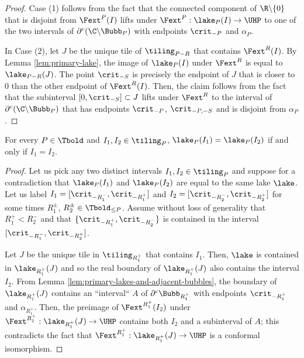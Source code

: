 \documentclass{amsart}
\begin{document}
\begin{proof}
    Case (1) follows from the fact that the connected component of $\R \backslash \{0\}$ that is disjoint from $\Fext^P(I)$ lifts under $\Fext^P : \lake_P(I) \to \UHP$ to one of the two intervals of $\partial^c(\C \backslash \Bubb_P)$ with endpoints $\crit_{-P}$ and $\alpha_P$.

    In Case (2), let $J$ be the unique tile of $\tiling_{P-R}$ that contains $\Fext^R(I)$.
    By Lemma \ref{lem:primary-lake}, the image of $\lake_P(I)$ under $\Fext^R$ is equal to $\lake_{P-R}(J)$.
    The point $\crit_{-S}$ is precisely the endpoint of $J$ that is closer to $0$ than the other endpoint of $\Fext^R(I)$.
    Then, the claim follows from the fact that the subinterval $[0,\crit_{-S}] \subset J$ lifts under $\Fext^R$ to the interval of $\partial^c(\C \backslash \Bubb_P)$ that has endpoints $\crit_{-P}$, $\crit_{-P,-S}$ and is disjoint from $\alpha_P$.
\end{proof}

\begin{lemma}
\label{lem:unique-primary-lake}
    For every $P \in \Tbold$ and $I_1, I_2 \in \tiling_P$, $\lake_P(I_1) = \lake_P(I_2)$ if and only if $I_1 = I_2$.
\end{lemma}

\begin{proof}
    Let us pick any two distinct intervals $I_1,I_2 \in \tiling_P$ and suppose for a contradiction that $\lake_P(I_1)$ and $\lake_P(I_2)$ are equal to the same lake $\lake$.
    Let us label $I_1 =[\crit_{-R_1^-},\crit_{-R_1^+}]$ and $I_2 =[\crit_{-R_2^-},\crit_{-R_2^+}]$ for some times $R_1^\pm$, $R_2^\pm \in \Tbold_{\leq P}$.
    Assume without loss of generality that $R_1^+ < R_2^-$ and that $\{\crit_{-R_1^+}, \crit_{-R_2^-}\}$ is contained in the interval $[\crit_{-R_1^-}, \crit_{-R_2^+}]$.
    
    Let $J$ be the unique tile in $\tiling_{R_1^+}$ that contains $I_1$.
    Then, $\lake$ is contained in $\lake_{R_1^+}(J)$ and so the real boundary of $\lake_{R_1^+}(J)$ also contains the interval $I_2$.
    From Lemma \ref{lem:primary-lakes-and-adjacent-bubbles}, the boundary of $\lake_{R_1^+}(J)$ contains an ``interval`` $A$ of $\partial^c \Bubb_{R_1^+}$ with endpoints $\crit_{-R_1^+}$ and $\alpha_{R_1^+}$.
    Then, the preimage of $\Fext^{R_1^+}(I_2)$ under $\Fext^{R_1^+}: \lake_{R_1^+}(J) \to \UHP$ contains both $I_2$ and a subinterval of $A$; this contradicts the fact that $\Fext^{R_1^+}: \lake_{R_1^+}(J) \to \UHP$ is a conformal isomorphism.
\end{proof}
\end{document}
